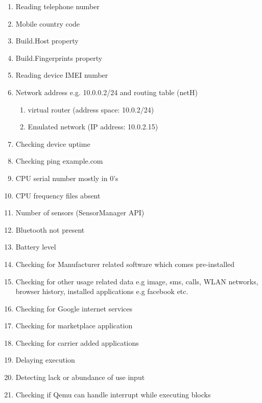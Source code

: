 \documentclass[../main.tex]{subfile}
\begin{document}
	\begin{enumerate}
		\item Reading telephone number \cite{sophos_anti_emulation} \cite{vidas2014evading}
		\item Mobile country code \cite{vidas2014evading}
		\item Build.Host property \cite{sophos_anti_emulation} \cite{vidas2014evading}
		\item Build.Fingerprints property \cite{sophos_anti_emulation}\cite{vidas2014evading}
		\item Reading device IMEI number
		\item Network address e.g. 10.0.0.2/24 and routing table (netH) \cite{vidas2014evading}
		\begin{enumerate}
			\item virtual router (address space: 10.0.2/24)
			\item Emulated network (IP address: 10.0.2.15)
		\end{enumerate}
		\item Checking device uptime
		\item Checking ping example.com
		\item CPU serial number mostly in 0's \cite{vidas2014evading}
		\item CPU frequency files absent \cite{vidas2014evading}
		\item Number of sensors (SensorManager API) \cite{vidas2014evading}
		\item Bluetooth not present \cite{vidas2014evading}
		\item Battery level \cite{vidas2014evading}
		\item Checking for Manufacturer related software which comes pre-installed \cite{vidas2014evading}
		\item Checking for other usage related data e.g image, sms, calls, WLAN networks, browser history, installed applications e.g facebook etc.
		\item Checking for Google internet services \cite{vidas2014evading}
		\item Checking for marketplace application \cite{vidas2014evading}
		\item Checking for carrier added applications \cite{vidas2014evading}
		\item Delaying execution \cite{sophos_anti_emulation}
		\item Detecting lack or abundance of use input
		\item Checking if Qemu can handle interrupt while executing blocks \cite{sophos_anti_emulation}

\end{enumerate}
\end{document}
